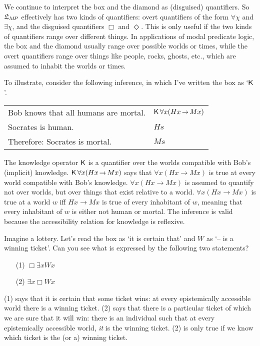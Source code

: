 We continue to interpret the box and the diamond as (disguised) quantifiers. So
$\mathfrak{L}_{M\!P}$ effectively has two kinds of quantifiers: overt quantifiers of the
form $\forall \chi$ and $\exists \chi$, and the disguised quantifiers $\Box$ and
$\Diamond$. This is only useful if the two kinds of quantifiers range over
different things. In applications of modal predicate logic, the box and the
diamond usually range over possible worlds or times, while the overt
quantifiers range over things like people, rocks, ghosts, etc., which are
assumed to inhabit the worlds or times.

To illustrate, consider the following inference, in which I've written the box as `$\operatorname{\mathsf{K}{}}$'.

\bigskip
\begin{tabular}{ll}
  Bob knows that all humans are mortal. & $\Kn\forall x (Hx \to Mx)$\\
  Socrates is human. & $Hs$\\
  Therefore: Socrates is mortal. & $Ms$
\end{tabular}
\bigskip

\noindent%
The knowledge operator $\operatorname{\mathsf{K}{}}$ is a quantifier over the worlds compatible with
Bob's (implicit) knowledge. $\Kn\forall x (Hx \to Mx)$ says that
$\forall x (Hx \to Mx)$ is true at every world compatible with Bob's knowledge.
$\forall x (Hx \to Mx)$ is assumed to quantify not over worlds, but over things
that exist relative to a world. $\forall x (Hx \to Mx)$ is true at a world $w$
iff $Hx \to Mx$ is true of every inhabitant of $w$, meaning that every
inhabitant of $w$ is either not human or mortal. The inference is valid because
the accessibility relation for knowledge is reflexive.

Imagine a lottery. Let's read the box as `it is certain that' and $W$ as `-- is
a winning ticket'. Can you see what is expressed by the following two
statements?
\begin{enumerate}[leftmargin=14mm]
  \itemsep-1mm
  \item[(1)] $\Box \exists x Wx$
  \item[(2)] $\exists x \Box Wx$
\end{enumerate}
%
(1) says that it is certain that some ticket wins: at every epistemically
accessible world there is a winning ticket. (2) says that there is a particular
ticket of which we are sure that it will win: there is an individual such that
at every epistemically accessible world, \emph{it} is the winning ticket.
(2) is only true if we know which ticket is the (or a) winning ticket.

